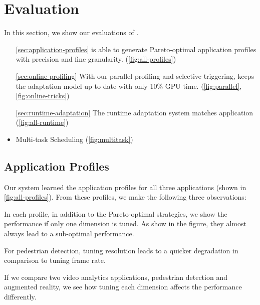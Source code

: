 \section{Evaluation}
\label{sec:evaluation}

In this section, we show our evaluations of \sysname{}.

\begin{itemize}
\item[\autoref{sec:application-profiles}] \sysname{} is able to generate
  Pareto-optimal application profiles with precision and fine
  granularity. (\autoref{fig:all-profiles})
\item[\autoref{sec:online-profiling}] With our parallel profiling and selective
  triggering, \sysname{} keeps the adaptation model up to date with only 10\%
  GPU time. (\autoref{fig:parallel}, \autoref{fig:online-tricks})
\item[\autoref{sec:runtime-adaptation}] The runtime adaptation system matches
  application  (\autoref{fig:all-runtime})
\item Multi-task Scheduling (\autoref{fig:multitask})
\end{itemize}

\subsection{Application Profiles}
\label{sec:application-profiles}

Our system learned the application profiles for all three applications (shown in
\autoref{fig:all-profiles}). From these profiles, we make the following three
observations:

 In each profile,
in addition to the Pareto-optimal strategies, we show the performance if only
one dimension is tuned. As show in the figure, they almost always lead to a
sub-optimal performance.

For pedestrian detection, tuning resolution leads to a quicker degradation in
comparison to tuning frame rate.

If we compare two video analytics applications, pedestrian detection and
augmented reality, we see how tuning each dimension affects the performance
differently.

